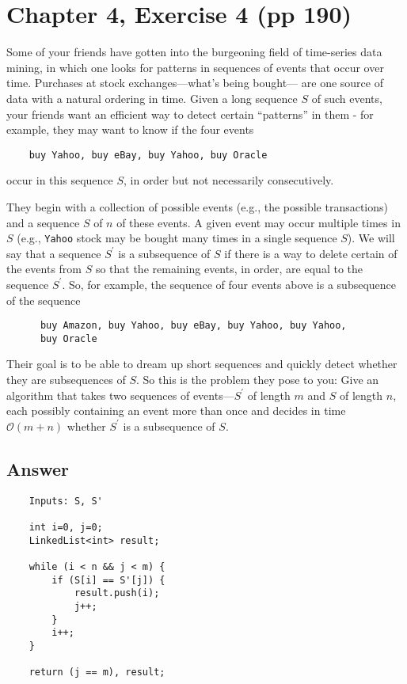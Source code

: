 \documentclass[12pt, letterpaper]{article}
\title{\ptitle{}}
\author{\pauthor{}}
\begin{document}
\maketitle

\section{Chapter 4, Exercise 4 (pp 190)}
Some of your friends have gotten into the burgeoning field of time-series data mining, in which one looks for patterns in sequences of events that occur over time. 
Purchases at stock exchanges—what's being bought— are one source of data with a natural ordering in time. Given a long sequence $S$ of such events, your friends want an efficient way to detect certain ``patterns'' in them - 
for example, they may want to know if the four events
\begin{verbatim}
    buy Yahoo, buy eBay, buy Yahoo, buy Oracle
\end{verbatim}
occur in this sequence $S$, in order but not necessarily consecutively.

They begin with a collection of possible events (e.g., the possible transactions) and a sequence $S$ of $n$ of these events.
A given event may occur multiple times in $S$ (e.g., \verb|Yahoo| stock may be bought many times in a single sequence $S$). 
We will say that a sequence $S^\prime$ is a subsequence of $S$ if there is a way to delete certain of the events from $S$ so that the remaining events, in order, are equal to the sequence $S^\prime$. 
So, for example, the sequence of four events above is a subsequence of the sequence
\begin{verbatim}
      buy Amazon, buy Yahoo, buy eBay, buy Yahoo, buy Yahoo, 
      buy Oracle
\end{verbatim}
Their goal is to be able to dream up short sequences and quickly detect whether they are subsequences of $S$. 
So this is the problem they pose to you: 
Give an algorithm that takes two sequences of events—$S^\prime$ of length $m$ and $S$ of length $n$, each possibly containing an event more than once and decides in time $\mathcal{O}(m + n)$ whether $S^\prime$ is a subsequence of $S$.

\subsection*{Answer}

\begin{verbatim}
    Inputs: S, S'

    int i=0, j=0;
    LinkedList<int> result;

    while (i < n && j < m) {
        if (S[i] == S'[j]) {
            result.push(i);
            j++;
        }
        i++;
    }

    return (j == m), result;
\end{verbatim}
\end{document}
